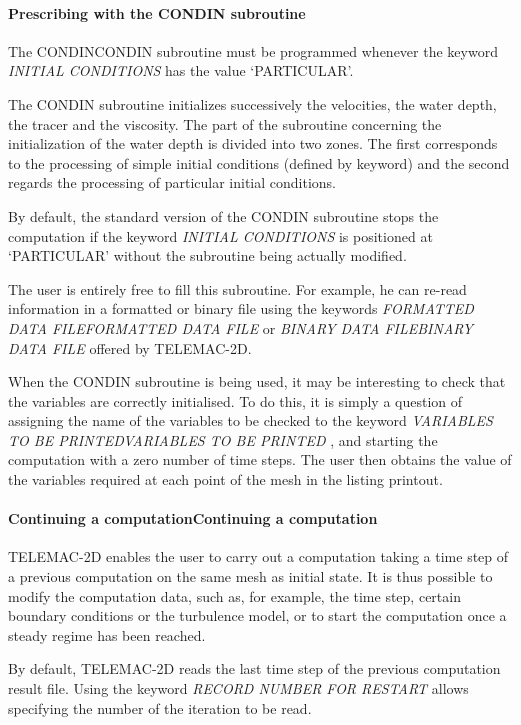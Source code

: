 \documentclass{article} %
\begin{document}
\paragraph{ Prescribing with the CONDIN subroutine}

 The CONDINCONDIN subroutine must be programmed whenever the keyword \textit{INITIAL CONDITIONS} has the value `PARTICULAR'.

 The CONDIN subroutine initializes successively the velocities, the water depth, the tracer and the viscosity. The part of the subroutine concerning the initialization of the water depth is divided into two zones. The first corresponds to the processing of simple initial conditions (defined by keyword) and the second regards the processing of particular initial conditions.

 By default, the standard version of the CONDIN subroutine stops the computation if the keyword \textit{INITIAL CONDITIONS} is positioned at `PARTICULAR' without the subroutine being actually modified.

 The user is entirely free to fill this subroutine. For example, he can re-read information in a formatted or binary file using the keywords \textit{FORMATTED DATA FILEFORMATTED DATA FILE} or \textit{BINARY DATA FILEBINARY DATA FILE} offered by TELEMAC-2D.

 When the CONDIN subroutine is being used, it may be interesting to check that the variables are correctly initialised. To do this, it is simply a question of assigning the name of the variables to be checked to the keyword \textit{VARIABLES TO BE PRINTEDVARIABLES TO BE PRINTED} , and starting the computation with a zero number of time steps. The user then obtains the value of the variables required at each point of the mesh in the listing printout.


\paragraph{ Continuing a computationContinuing a computation}

 TELEMAC-2D enables the user to carry out a computation taking a time step of a previous computation on the same mesh as initial state. It is thus possible to modify the computation data, such as, for example, the time step, certain boundary conditions or the turbulence model, or to start the computation once a steady regime has been reached.

 By default, TELEMAC-2D reads the last time step of the previous computation result file. Using the keyword \textit{RECORD NUMBER FOR RESTART} allows specifying the number of the iteration to be read.
\end{document}
